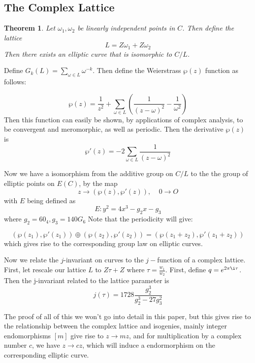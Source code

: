 \documentclass[12pt,twoside]{article}
\newtheorem{theorem}{Theorem}
\begin{document}
\subsection{The Complex Lattice}
\begin{theorem} 
Let $\omega_{1}, \omega_{2}$ be linearly independent points in $C$. Then define the lattice 
$$ L = Z\omega_{1} + Z \omega_{2}$$ Then there exists an elliptic curve that is isomorphic to $C/ L$. 
\end{theorem}
Define $G_{k}(L) = \sum_{\omega \in L}\omega^{-k}$. Then define the Weierstrass $\wp (z) $ function as follows: 

\begin{equation} 
\wp(z) = \frac{1}{z^{2}} + \sum_{\omega \in L}\left(\frac{1}{(z-\omega)^{2}} - \frac{1}{\omega^{2}}\right) 
\end{equation}  
Then this function can easily be shown, by applications of complex analysis, to be convergent and meromorphic, as well as periodic. Then the derivative $\wp(z)$ is 
\begin{equation} 
\wp ' (z) = -2 \sum_{\omega \in L} \frac{1}{(z- \omega)^{2}} 
\end{equation} 

Now we have a isomorphism from the additive group on $C/L$ to the the group of elliptic points on $E(C)$, by the map $$z \rightarrow ( \wp(z), \wp' (z)), \> \> \> \> \> 0 \rightarrow O $$ with $E$ being defined as 
\begin{equation} 
E: y^{2} = 4x^{3} - g_{2}x - g_{3} 
\end{equation} 
where $g_{2} = 60_{4}, g_{3} = 140G_{6}$  
Note that the periodicity will give: 

\begin{equation} 
(\wp(z_{1}), \wp'(z_{1})) \oplus (\wp(z_{2}), \wp'(z_{2})) = (\wp(z_{1} + z_{2}), \wp'(z_{1} + z_{2})) 
\end{equation} which gives rise to the corresponding group law on elliptic curves. 

Now we relate the $j$-invariant on curves to the $j-$function of a complex lattice. First, let rescale our lattice $L$ to $Z\tau + Z$ where $\tau = \frac{w_{1}}{w_{2}}$. First, define $q = e^{2\pi \i \tau}$. Then the j-invariant related to the lattice parameter is 
\begin{equation}
j(\tau) = 1728 \frac{g_{2}^{3}}{g_{2}^{3} - 27 g_{3}^{2}} 
\end{equation} 
 
 
The proof of all of this we won't go into detail in this paper, but this gives rise to the relationship between the complex lattice and isogenies, mainly integer endomorphisms $[m]$ give rise to $ z \rightarrow mz$, and for multiplication by a complex number $c$, we have $z \rightarrow cz$, which will induce a endormorphism on the corresponding elliptic curve.   
\end{document}
